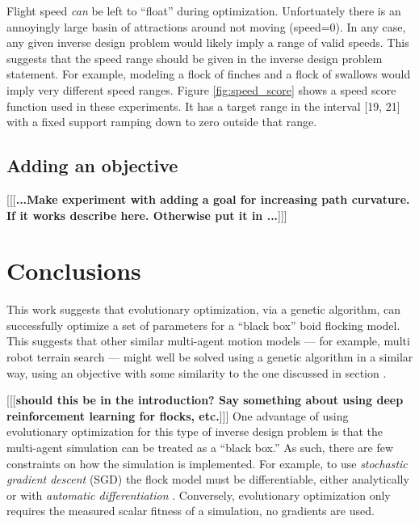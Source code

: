 \documentclass[letterpaper]{article}
\begin{document}
Flight speed \textit{can} be left to “float” during optimization. Unfortuately there is an annoyingly large basin of attractions around not moving (speed=0). In any case, any given inverse design problem would likely imply a range of valid speeds. This suggests that the speed range should be given in the inverse design problem statement. For example, modeling a flock of finches and a flock of swallows would imply very different speed ranges. Figure \ref{fig:speed_score} shows a speed score function used in these experiments. It has a target range in the interval [19, 21] with a fixed support ramping down to zero outside that range.

\subsection{Adding an objective}
\label{subsec:add_objective}

[[[\textbf{...Make experiment with adding a goal for increasing path curvature. If it works describe here. Otherwise put it in ...}]]]

\section{Conclusions}
\label{sec:Conclusions}

This work suggests that evolutionary optimization, via a genetic algorithm, can successfully optimize a set of parameters for a ``black box'' boid flocking model. This suggests that other similar multi-agent motion models --- for example, multi robot terrain search --- might well be solved using a genetic algorithm in a similar way, using an objective with some similarity to the one discussed in section .

[[[\textbf{should this be in the introduction? Say something about using deep reinforcement learning for flocks, etc.}]]] One advantage of using evolutionary optimization for this type of inverse design problem is that the multi-agent simulation can be treated as a ``black box.'' As such, there are few constraints on how the simulation is implemented. For example, to use \textit{stochastic gradient descent} (SGD) \citep{robbins_stochastic_1951} the flock model must be differentiable, either analytically or with \textit{automatic differentiation} \citep{baydin_automatic_2018}. Conversely, evolutionary optimization only requires the measured scalar fitness of a simulation, no gradients are used.
\end{document}
